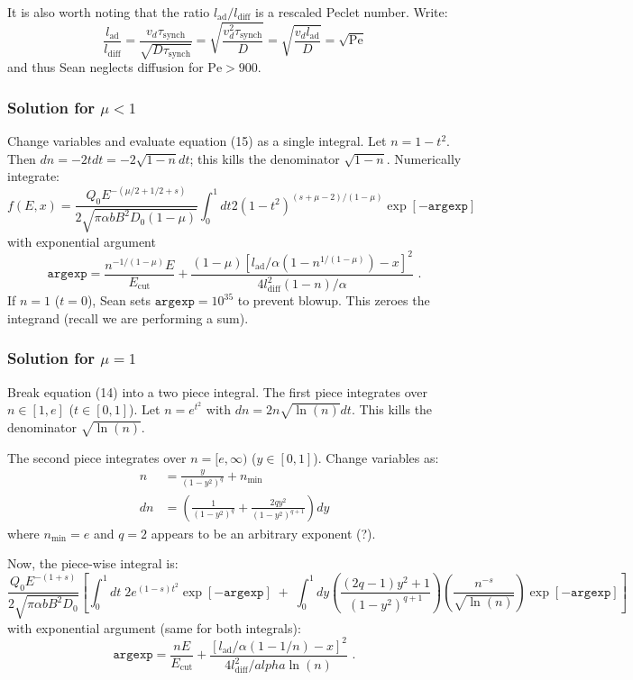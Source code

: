 \documentclass[10pt]{article}
\newcommand{\mt}{\mathrm}
\begin{document}
It is also worth noting that the ratio $l_{\mt{ad}} / l_{\mt{diff}}$ is a
rescaled Peclet number.  Write:
\[
    \frac{l_{\mt{ad}}}{l_{\mt{diff}}}
    = \frac{ v_d \tau_{\mt{synch}} }{ \sqrt{D \tau_{\mt{synch}}} }
    = \sqrt{ \frac{ v_d^2 \tau_{\mt{synch}} }{ D } }
    = \sqrt{ \frac{ v_d l_{\mt{ad}} }{ D } }
    = \sqrt{\mt{Pe}}
\]
and thus Sean neglects diffusion for $\mt{Pe} > 900$.


\subsubsection{Solution for \texorpdfstring{$\mu < 1$}{mu lt 1}}
Change variables and evaluate equation (15) as a single integral.
Let $n = 1 - t^2$. Then $dn = -2t dt = -2\sqrt{1-n}dt$;
this kills the denominator $\sqrt{1-n}$.  Numerically integrate:
\[
    f(E,x) = \frac{Q_0 E^{-(\mu/2 + 1/2 + s)}}
            {2 \sqrt{\pi \alpha b B^2 D_0 (1-\mu)}} 
            \int_0^1 dt 2 (1-t^2)^{ (s+\mu-2) / (1-\mu) }
            \exp[ - \mathtt{argexp} ]
\]
with exponential argument
\[
    \mathtt{argexp} = \frac{n^{-1/(1-\mu)} E}{E_{\mt{cut}}}
    + \frac{(1 - \mu)
        \left[ l_{\mt{ad}}/\alpha \left(1 - n^{1/(1-\mu)}\right) - x \right]^2}
        {4 l_{\mt{diff}}^2 (1-n) / \alpha}
    \text{ .}
\]
If $n=1$ ($t=0$), Sean sets $\mathtt{argexp} = 10^{35}$ to prevent blowup.
This zeroes the integrand (recall we are performing a sum).


\subsubsection{Solution for \texorpdfstring{$\mu = 1$}{mu eq 1}}
Break equation (14) into a two piece integral.
The first piece integrates over $n\in [1,e]$ ($t\in[0,1]$).
Let $n = e^{t^2}$ with $dn = 2 n \sqrt{\ln(n)} dt$.
This kills the denominator $\sqrt{\ln(n)}$.

The second piece integrates over $n=[e,\infty)$ ($y\in[0,1]$).
Change variables as:
\begin{align*}
    n &= \frac{y}{(1-y^2)^q} + n_{\mt{min}} \\
    dn &= \left( \frac{1}{(1-y^2)^q} + \frac{2qy^2}{(1 - y^2)^{q+1}} \right) dy
\end{align*}
where $n_{\mt{min}} = e$ and $q = 2$ appears to be an arbitrary exponent (?).

Now, the piece-wise integral is:
\[
    \frac{Q_0 E^{-(1+s)}}
         { 2 \sqrt{ \pi \alpha b B^2 D_0 } }
    \left[
        \int_0^1 dt \; 2 e^{(1-s) t^2} \exp[ - \mathtt{argexp} ]
        \; + \;
        \int_0^1 dy \left(\frac{(2q-1) y^2 + 1}{(1 - y^2)^{q+1}}\right)
                    \left(\frac{n^{-s}}{ \sqrt{\ln(n)} }\right)
                    \exp[ - \mathtt{argexp} ]
    \right]
\]
with exponential argument (same for both integrals):
\[
    \mathtt{argexp} = \frac{n E}{E_{\mt{cut}}}
        + \frac{ \left[ l_{\mt{ad}}/\alpha (1 - 1/n) - x \right]^2 }
        { 4 l_{\mt{diff}}^2 /alpha \ln(n) }
    \text{ .}
\]
\end{document}
